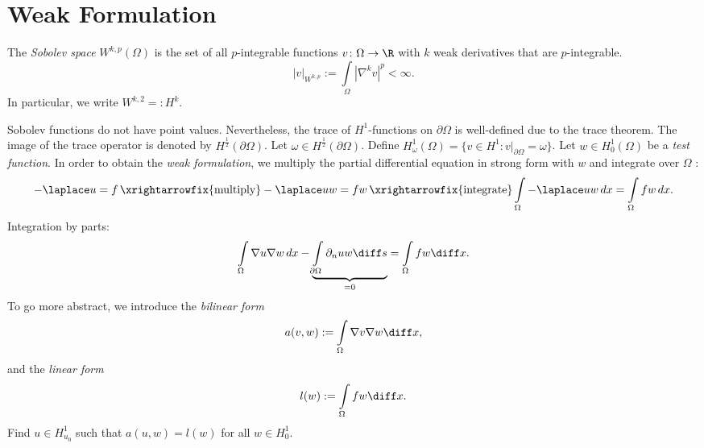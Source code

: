 \section{Weak Formulation}
\begin{definition}
The \emph{Sobolev space} $W^{k,p}(\Omega)$ is the set of all $p$-integrable functions $v\colon\Omega\to\R$ with $k$ weak derivatives that are $p$-integrable. 
\begin{equation*}
    |v|_{W^{k,p}}:=\int\limits_\Omega|\nabla^kv|^p<\infty.
\end{equation*}
In particular, we write $W^{k,2}=:H^k$.
\end{definition}
Sobolev functions do not have point values. Nevertheless, the trace of $H^1$-functions on $\partial\Omega$ is well-defined due to the trace theorem. The image of the trace operator is denoted by $H^{\frac{1}{2}}(\partial\Omega)$. Let $\omega\in H^{\frac{1}{2}}(\partial\Omega)$. Define $H_\omega^1(\Omega)=\{ v\in H^1\colon v|_{\partial\Omega}=\omega\}$. Let $w\in H_0^1(\Omega)$ be a \textit{test function}. In order to obtain the \textit{weak formulation}, we multiply the partial differential equation in strong form with $w$ and integrate over $\Omega$ : 
\begin{equation*}
    -\laplace u=f\, \xrightarrowfix{\text{multiply}}-\laplace uw=fw\,\xrightarrowfix{\text{integrate}}\int\limits_\Omega-\laplace uw\,dx=\int\limits_\Omega fw\,dx.
\end{equation*}
Integration by parts: 
\begin{equation*}
    \int\limits_\Omega\nabla u\nabla w\,dx-\underbrace{\int\limits_{\partial\Omega}\partial_{n}uw \diff s}_{=0}=\int\limits_\Omega fw\diff x.
\end{equation*}
To go more abstract, we introduce the \textit{bilinear form} 
\begin{equation*}
    a(v,w):=\int\limits_\Omega\nabla v\nabla w\diff x,
\end{equation*}
and the \textit{linear form}
\begin{equation*}
    l(w):=\int\limits_\Omega fw\diff x.
\end{equation*}
Find $u\in H_{u_0}^1$ such that $a(u,w)=l(w)$ for all $w\in H_0^1$.
